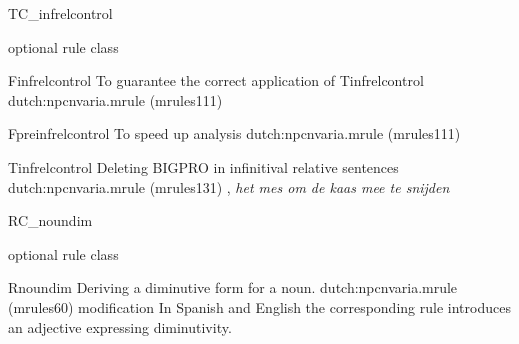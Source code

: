 \begin{mruleclass}{TC\_infrelcontrol}
\begin{classdescr}
\kind optional rule class
\classtask 
\classremarks
\begin{filters}
\begin{members}
\begin{member}
 Finfrelcontrol
 To guarantee the correct application of Tinfrelcontrol
\file dutch:npcnvaria.mrule (mrules111)
\end{member}
\end{members}
\end{filters}
\begin{speedrules}
\begin{members}
\begin{member}
 Fpreinfrelcontrol
 To speed up analysis
\file dutch:npcnvaria.mrule (mrules111)
\end{member}
\end{members}
\end{speedrules}
\noplannedrules
\norulesnotince
\begin{comments}
\end{comments}

\end{classdescr}
\begin{members}
\begin{member}
 Tinfrelcontrol
  Deleting BIGPRO in infinitival relative sentences
\file dutch:npcnvaria.mrule (mrules131)
\semantics \nosemantics
{}, 
{\em het mes om de kaas mee te snijden}
\end{member}

\end{members}

\end{mruleclass}

\begin{mruleclass}{RC\_noundim}
\begin{classdescr}
\kind optional rule class
\classtask 
\classremarks
\nofilters
\nospeedrules
\noplannedrules
\norulesnotince
\begin{comments}
\end{comments}

\end{classdescr}
\begin{members}
\begin{member}
 Rnoundim
 Deriving a diminutive form for a noun. 
\file dutch:npcnvaria.mrule (mrules60)
\semantics modification
 
\remarks In Spanish and English the corresponding rule introduces an adjective 
expressing diminutivity.
\end{member}

\end{members}

\end{mruleclass}

